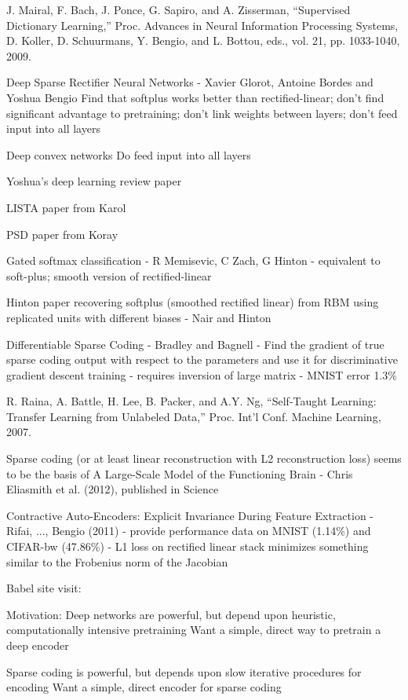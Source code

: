 J. Mairal, F. Bach, J. Ponce, G. Sapiro, and A. Zisserman, “Supervised Dictionary Learning,” Proc. Advances in Neural Information Processing Systems, D. Koller, D. Schuurmans, Y. Bengio, and L. Bottou, eds., vol. 21, pp. 1033-1040, 2009.



Deep Sparse Rectifier Neural Networks - Xavier Glorot, Antoine Bordes and Yoshua Bengio
Find that softplus works better than rectified-linear; don't find significant advantage to pretraining; don't link weights between layers; don't feed input into all layers

Deep convex networks
Do feed input into all layers

Yoshua's deep learning review paper

LISTA paper from Karol

PSD paper from Koray

Gated softmax classification - R Memisevic, C Zach, G Hinton - equivalent to soft-plus; smooth version of rectified-linear

Hinton paper recovering softplus (smoothed rectified linear) from RBM using replicated units with different biases - Nair and Hinton

Differentiable Sparse Coding - Bradley and Bagnell - Find the gradient of true sparse coding output with respect to the parameters and use it for discriminative gradient descent training - requires inversion of large matrix - MNIST error 1.3\%


R. Raina, A. Battle, H. Lee, B. Packer, and A.Y. Ng, “Self-Taught Learning: Transfer Learning from Unlabeled Data,” Proc. Int’l Conf. Machine Learning, 2007.

Sparse coding (or at least linear reconstruction with L2 reconstruction loss) seems to be the basis of A Large-Scale Model of the Functioning Brain - Chris Eliasmith et al. (2012), published in Science


Contractive Auto-Encoders: Explicit Invariance During Feature Extraction - Rifai, ..., Bengio (2011) - provide performance data on MNIST (1.14\%) and CIFAR-bw (47.86\%) - L1 loss on rectified linear stack minimizes something similar to the Frobenius norm of the Jacobian



Babel site visit:

Motivation:
Deep networks are powerful, but depend upon heuristic, computationally intensive pretraining
Want a simple, direct way to pretrain a deep encoder

Sparse coding is powerful, but depends upon slow iterative procedures for encoding
Want a simple, direct encoder for sparse coding

